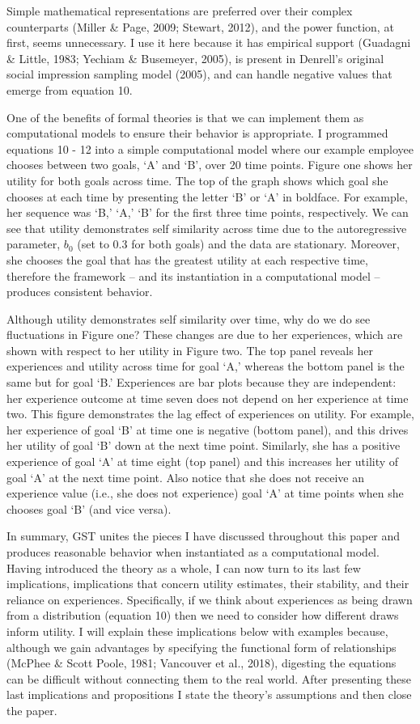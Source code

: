 \documentclass[english,,man]{apa6}
\theoremstyle{definition}
\theoremstyle{definition}
\theoremstyle{definition}
\theoremstyle{remark}
\begin{document}
Simple mathematical representations are preferred over their complex
counterparts (Miller \& Page, 2009; Stewart, 2012), and the power
function, at first, seems unnecessary. I use it here because it has
empirical support (Guadagni \& Little, 1983; Yechiam \& Busemeyer,
2005), is present in Denrell's original social impression sampling model
(2005), and can handle negative values that emerge from equation 10.

One of the benefits of formal theories is that we can implement them as
computational models to ensure their behavior is appropriate. I
programmed equations 10 - 12 into a simple computational model where our
example employee chooses between two goals, `A' and `B', over 20 time
points. Figure one shows her utility for both goals across time. The top
of the graph shows which goal she chooses at each time by presenting the
letter `B' or `A' in boldface. For example, her sequence was `B,' `A,'
`B' for the first three time points, respectively. We can see that
utility demonstrates self similarity across time due to the
autoregressive parameter, \(b_0\) (set to 0.3 for both goals) and the
data are stationary. Moreover, she chooses the goal that has the
greatest utility at each respective time, therefore the framework -- and
its instantiation in a computational model -- produces consistent
behavior.

Although utility demonstrates self similarity over time, why do we do
see fluctuations in Figure one? These changes are due to her
experiences, which are shown with respect to her utility in Figure two.
The top panel reveals her experiences and utility across time for goal
`A,' whereas the bottom panel is the same but for goal `B.' Experiences
are bar plots because they are independent: her experience outcome at
time seven does not depend on her experience at time two. This figure
demonstrates the lag effect of experiences on utility. For example, her
experience of goal `B' at time one is negative (bottom panel), and this
drives her utility of goal `B' down at the next time point. Similarly,
she has a positive experience of goal `A' at time eight (top panel) and
this increases her utility of goal `A' at the next time point. Also
notice that she does not receive an experience value (i.e., she does not
experience) goal `A' at time points when she chooses goal `B' (and vice
versa).

In summary, GST unites the pieces I have discussed throughout this paper
and produces reasonable behavior when instantiated as a computational
model. Having introduced the theory as a whole, I can now turn to its
last few implications, implications that concern utility estimates,
their stability, and their reliance on experiences. Specifically, if we
think about experiences as being drawn from a distribution (equation 10)
then we need to consider how different draws inform utility. I will
explain these implications below with examples because, although we gain
advantages by specifying the functional form of relationships (McPhee \&
Scott Poole, 1981; Vancouver et al., 2018), digesting the equations can
be difficult without connecting them to the real world. After presenting
these last implications and propositions I state the theory's
assumptions and then close the paper.
\end{document}
